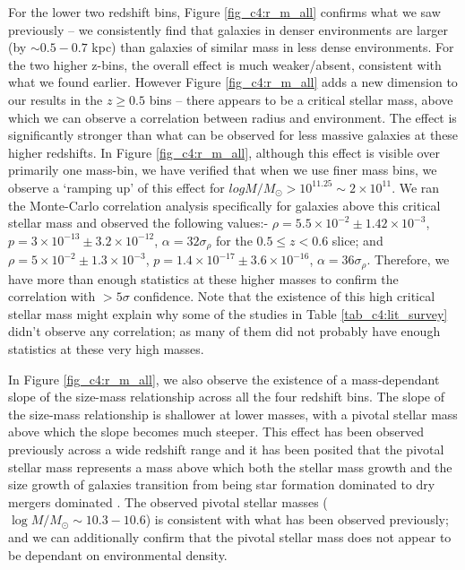 For the lower two redshift bins, Figure \ref{fig_c4:r_m_all} confirms what we saw previously -- we consistently find that galaxies in denser environments are larger (by $\sim 0.5-0.7$ kpc) than galaxies of similar mass in less dense environments. For the two higher z-bins, the overall effect is much weaker/absent, consistent with what we found earlier. However Figure \ref{fig_c4:r_m_all} adds a new dimension to our results in the $z \geq 0.5$ bins -- there appears to be a critical stellar mass, above which we can observe a correlation between radius and environment. The effect is significantly stronger than what can be observed for less massive galaxies at these higher redshifts. In Figure \ref{fig_c4:r_m_all}, although this effect is visible over primarily one mass-bin, we have verified that when we use finer mass bins, we observe a `ramping up' of this effect for $log M/M_{\odot} > 10^{11.25} \sim 2\times10^{11}$. We ran the Monte-Carlo correlation analysis specifically for galaxies above this critical stellar mass and observed the following values:- $\rho = 5.5\times10^{-2} \pm 1.42\times10^{-3}$, $p = 3\times10^{-13} \pm 3.2\times10^{-12}$, $\alpha=32\sigma_{\rho}$ for the $0.5 \leq z < 0.6$ slice; and $\rho = 5\times10^{-2} \pm 1.3\times10^{-3}$, $p = 1.4\times10^{-17} \pm 3.6\times10^{-16}$, $\alpha=36\sigma_{\rho}$. Therefore, we have more than enough statistics at these higher masses to confirm the correlation with $>5\sigma$ confidence. Note that the existence of this high critical stellar mass might explain why some of the studies in Table \ref{tab_c4:lit_survey} didn't observe any correlation; as many of them did not probably have enough statistics at these very high masses. 

In Figure \ref{fig_c4:r_m_all}, we also observe the existence of a mass-dependant slope of the size-mass relationship across all the four redshift bins. The slope of the size-mass relationship is shallower at lower masses, with a pivotal stellar mass above which the slope becomes much steeper. This effect has been observed previously across a wide redshift range and it has been posited that the pivotal stellar mass represents a mass above which both the stellar mass growth and the size growth of galaxies transition from being star formation dominated to dry mergers dominated \citep[e.g.,][]{mowla19,hsc_mass_size}. The observed pivotal stellar masses ($\log M/M_{\odot} \sim 10.3-10.6$) is consistent with what has been observed previously; and we can additionally confirm that the pivotal stellar mass does not appear to be dependant on environmental density. 

